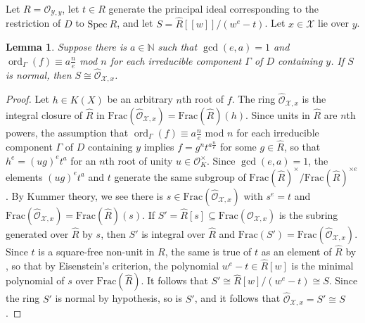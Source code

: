 \documentclass[12pt]{amsart}
\numberwithin{equation}{section}
\newtheorem{lemma}[equation]{Lemma}
\theoremstyle{definition}
\newcommand{\N}{\mathbb N}
\renewcommand{\O}{\mathcal{O}}
\newcommand{\Spec}{\mathrm{Spec} \ }
\newcommand{\m}{\mathfrak{m}}
\newcommand{\X}{\mathcal{X}}
\newcommand{\Y}{\mathcal{Y}}
\newcommand{\tx}[1]{\text{#1}}
\DeclareMathOperator{\ord}{ord}
\begin{document}
Let $R=\O_{\Y,y}$, let $t\in R$ generate the principal ideal corresponding to the restriction of $D$ to $\Spec R$, and let $S=\widehat{R}[[w]]/(w^e-t)$. Let $x\in\X$ lie over $y$. 

\begin{lemma}\label{lemma: local ring upstairs}
    Suppose there is $a\in\N$ such that $\gcd(e,a)=1$ and $\ord_\Gamma(f)\equiv a\frac{n}{e}$ \textup{mod} $n$ for each irreducible component $\Gamma$ of $D$ containing $y$. If $S$ is normal, then $S\cong\widehat{\O}_{\X,x}$. 
\end{lemma}

\begin{proof}
    Let $h\in K(X)$ be an arbitrary $n$th root of $f$. The ring $\widehat{\O}_{\X,x}$ is the integral closure of $\widehat{R}$ in $\tx{Frac}(\widehat{\O}_{\X,x})=\tx{Frac}(\widehat{R})(h)$. Since units in $\widehat{R}$ are $n$th powers, the assumption that $\ord_\Gamma(f)\equiv a\frac{n}{e}$ \textup{mod} $n$ for each irreducible component $\Gamma$ of $D$ containing $y$ implies $f=g^nt^{a\frac{n}{e}}$ for some $g\in\widehat{R}$, so that $h^e=(ug)^et^a$ for an $n$th root of unity $u\in\O_K^\times$. Since $\gcd(e,a)=1$, the elements $(ug)^et^a$ and $t$ generate the same subgroup of $\tx{Frac}(\widehat{R})^{\times}/\tx{Frac}(\widehat{R})^{\times e}$. By Kummer theory, we see there is $s\in\tx{Frac}(\widehat{\O}_{\X,x})$ with $s^e=t$ and $\tx{Frac}(\widehat{\O}_{\X,x})=\tx{Frac}(\widehat{R})(s)$.
    If $S'=\widehat{R}[s]\subseteq\tx{Frac}(\mathcal{\O}_{\X,x})$ is the subring generated over $\widehat{R}$ by $s$, then $S'$ is integral over $\widehat{R}$ %
     and $\tx{Frac}(S')=\tx{Frac}(\widehat{\mathcal{\O}}_{\X,x})$. Since $t$ is a square-free non-unit in $R$, the same is true of $t$ as an element of $\widehat{R}$ by \cite[Tag 07NZ (3)]{stacks-project}, so that by Eisenstein's criterion, the polynomial $w^e-t\in\widehat{R}[w]$ is the minimal polynomial of $s$ over $\tx{Frac}(\widehat{R})$. It follows that $S'\cong\widehat{R}[w]/(w^e-t)\cong S$. Since the ring $S'$ is normal by hypothesis, so is $S'$, and it follows that $\widehat{\O}_{\X,x}=S'\cong S$.
\end{proof}
\end{document}
